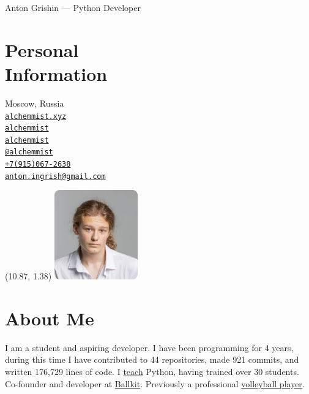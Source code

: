 \documentclass[margin,line]{resume}
\begin{document}
{\vspace*{-13mm}\sc \large Anton Grishin — Python Developer} \\
\begin{resume}
  \begin{minipage}[t]{0.55\textwidth}
    \section{\mysidestyle Personal\\Information}
    Moscow, Russia \\
    \faHome  \space
    \href{https://alchemmist.xyz}{\texttt{alchemmist.xyz}} \\
    \faGithub  \space
    \href{https://github.com/alchemmist/}{\texttt{alchemmist}} \\
    \faLinkedin \space
    \href{https://www.linkedin.com/in/alchemmist/}{\texttt{alchemmist}}
    \\
    \faPaperPlane \space \href{https://t.me/alchemmist}{\texttt{@alchemmist}} \\
    \faPhone \space
    \href{tel:+1234567890}{\color{blue}\texttt{+7(915)067-2638}}  \\
    \faEnvelope \space
    \href{mailto:anton.ingrish@gmail.com}{\color{blue}\texttt{anton.ingrish@gmail.com}}
  \end{minipage}

  \begin{minipage}[H]{0.18\textwidth}
    \begin{textblock}{7}(10.87, 1.38)
      \includegraphics[width=0.270\textwidth]{../images/avatar.png}
    \end{textblock}
  \end{minipage}


  \vspace{-7mm}
  \section{\mysidestyle About Me}
  I am a student and aspiring developer. I have been programming for 4 years, during this time I have contributed to 44 repositories, made 921 commits, and written 176,729 lines of code.
  I \href{https://www.avito.ru/moskva/predlozheniya_uslug/prepodavatel_programmirovaniya_na_python_2556461612}{teach}
  Python, having trained over 30 students. Co-founder and developer at \href{https://ballkit.ru/}{Ballkit}. Previously a professional \href{https://alchemmist.github.io/CV/attachments/sport.pdf}{volleyball player}.


\end{resume}
\end{document}
